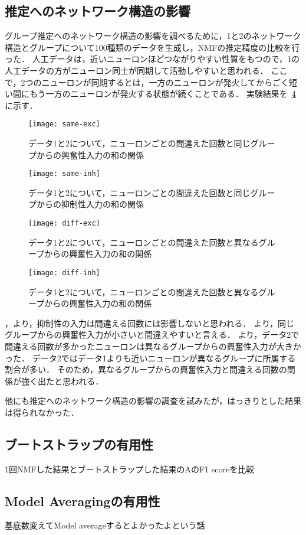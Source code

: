 \subsection{推定へのネットワーク構造の影響}
グループ推定へのネットワーク構造の影響を調べるために，1と2のネットワーク構造とグループについて100種類のデータを生成し，NMFの推定精度の比較を行った．
人工データは，近いニューロンほどつながりやすい性質をもつので，1の人工データの方がニューロン同士が同期して活動しやすいと思われる．
ここで，2つのニューロンが同期するとは，一方のニューロンが発火してからごく短い間にもう一方のニューロンが発火する状態が続くことである．
実験結果を~\ref{fig:diff-inh}に示す．
\begin{figure}[htbp]
    \begin{center}
        \texttt{[image: same-exc]}
        \caption{データ1と2について，ニューロンごとの間違えた回数と同じグループからの興奮性入力の和の関係}
        \label{fig:same-exc}
    \end{center}
\end{figure}
\begin{figure}[htbp]
    \begin{center}
      \texttt{[image: same-inh]}
        \caption{データ1と2について，ニューロンごとの間違えた回数と同じグループからの抑制性入力の和の関係}
        \label{fig:same-inh}
    \end{center}
\end{figure}
\begin{figure}[htbp]
    \begin{center}
        \texttt{[image: diff-exc]}
        \caption{データ1と2について，ニューロンごとの間違えた回数と異なるグループからの興奮性入力の和の関係}
        \label{fig:diff-exc}
    \end{center}
\end{figure}
\begin{figure}[htbp]
    \begin{center}
        \texttt{[image: diff-inh]}
        \caption{データ1と2について，ニューロンごとの間違えた回数と異なるグループからの興奮性入力の和の関係}
        \label{fig:diff-inh}
    \end{center}
\end{figure}
，より，抑制性の入力は間違える回数には影響しないと思われる．
より，同じグループからの興奮性入力が小さいと間違えやすいと言える．
より，データ2で間違える回数が多かったニューロンは異なるグループからの興奮性入力が大きかった．
データ2ではデータ1よりも近いニューロンが異なるグループに所属する割合が多い．
そのため，異なるグループからの興奮性入力と間違える回数の関係が強く出たと思われる．

他にも推定へのネットワーク構造の影響の調査を試みたが，はっきりとした結果は得られなかった．

\subsection{ブートストラップの有用性}
1回NMFした結果とブートストラップした結果のAのF1 scoreを比較

\subsection{Model Averagingの有用性}
基底数変えてModel averageするとよかったよという話
